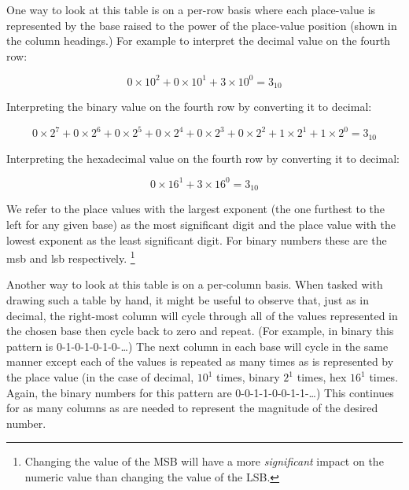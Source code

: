 One way to look at this table is on a per-row basis where each 
\gls{place-value}
is represented by the base raised to the power of the \gls{place-value}
position (shown in the column headings.)  
For example to interpret the decimal value on the fourth row: 

\begin{equation}
0 \times 10^2 + 0 \times 10^1 + 3 \times 10^0 = 3_{10}
\end{equation}

Interpreting the binary value on the fourth row by converting it to decimal:

\begin{equation}
0 \times 2^7 + 0 \times 2^6 +0 \times 2^5 +0 \times 2^4 +0 \times 2^3 +0 \times 2^2 + 1 \times 2^1 + 1 \times 2^0 = 3_{10}
\end{equation}

Interpreting the hexadecimal value on the fourth row by converting it to decimal:

\begin{equation}
0 \times 16^1 + 3 \times 16^0 = 3_{10}
\end{equation}

%
%
We refer to the place values with the largest exponent (the one furthest to the 
left for any given base) as the most significant digit and the place value
with the lowest exponent as the least significant digit.  For binary
numbers these are the \acrfull{msb} and \acrfull{lsb} respectively.%
\footnote{Changing the value of the MSB will have a more {\em significant}
impact on the numeric value than changing the value of the LSB.} 


Another way to look at this table is on a per-column basis.  When
tasked with drawing such a table by hand, it might be useful 
to observe that, just as in decimal, the right-most column will
cycle through all of the values represented in the chosen base
then cycle back to zero and repeat.  (For example, in binary this
pattern is 0-1-0-1-0-1-0-\ldots) The next column in each base
will cycle in the same manner except each of the values is repeated
as many times as is represented by the place value (in the case of 
decimal, $10^1$ times, binary $2^1$ times, hex $16^1$ times.  Again,
the binary numbers for this pattern are 0-0-1-1-0-0-1-1-\ldots)
This continues for as many columns as are needed to represent the 
magnitude of the desired number.

